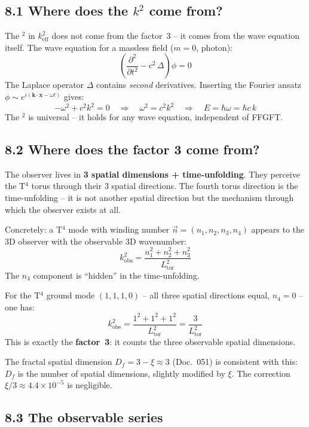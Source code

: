 \subsection*{8.1 Where does the $k^2$ come from?}

The $^2$ in $k_\mathrm{eff}^2$ does not come from the factor~3 --
it comes from the wave equation itself.
The wave equation for a massless field ($m=0$, photon):
\[
  \left(\frac{\partial^2}{\partial t^2} - c^2\,\Delta\right)\phi = 0
\]
The Laplace operator $\Delta$ contains \emph{second} derivatives.
Inserting the Fourier ansatz $\phi \sim e^{i(\mathbf{k}\cdot\mathbf{x}-\omega t)}$
gives:
\[
  -\omega^2 + c^2 k^2 = 0
  \quad\Rightarrow\quad
  \omega^2 = c^2 k^2
  \quad\Rightarrow\quad
  E = \hbar\omega = \hbar c\,k
\]
The $^2$ is universal -- it holds for any wave equation,
independent of FFGFT.

\subsection*{8.2 Where does the factor 3 come from?}

The observer lives in \textbf{3 spatial dimensions + time-unfolding}.
They perceive the T$^4$ torus through their 3 spatial directions.
The fourth torus direction is the time-unfolding -- it is not
another spatial direction but the mechanism through which the
observer exists at all.

Concretely: a T$^4$ mode with winding number
$\vec{n} = (n_1, n_2, n_3, n_4)$ appears to the 3D observer
with the observable 3D wavenumber:
\[
  k_\mathrm{obs}^2 = \frac{n_1^2 + n_2^2 + n_3^2}{L_\mathrm{tor}^2}
\]
The $n_4$ component is ``hidden'' in the time-unfolding.

For the T$^4$ ground mode $(1,1,1,0)$ -- all three spatial directions
equal, $n_4 = 0$ -- one has:
\[
  k_\mathrm{obs}^2 = \frac{1^2+1^2+1^2}{L_\mathrm{tor}^2}
  = \frac{3}{L_\mathrm{tor}^2}
\]
This is exactly the \textbf{factor~3}: it counts the three
observable spatial dimensions.

The fractal spatial dimension $D_f = 3 - \xi \approx 3$
(Doc.~051) is consistent with this: $D_f$ is the number of
spatial dimensions, slightly modified by $\xi$. The correction
$\xi/3 \approx 4{.}4 \times 10^{-5}$ is negligible.

\subsection*{8.3 The observable series}

